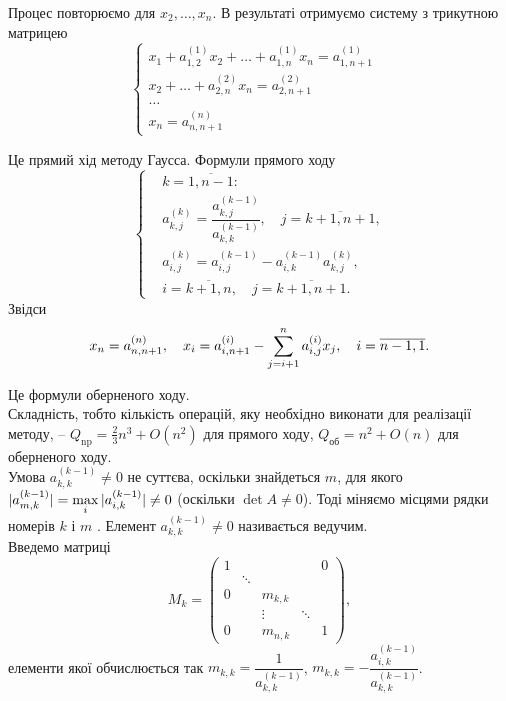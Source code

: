 Процес повторюємо для $x_2, \ldots, x_n$. В результаті отримуємо систему з трикутною матрицею
\begin{equation}
	\label{eq:3.3}
	\left\{
		\begin{aligned}
		x_1 + a_{1,2}^{(1)} x_2 + \ldots + a_{1,n}^{(1)} x_n = a_{1,n+1}^{(1)}& \\
		x_2 + \ldots + a_{2,n}^{(2)} x_n = a_{2,n+1}^{(2)}& \\
		\ldots & \\
		x_n = a_{n,n+1}^{(n)} &
	\end{aligned}
	\right.
\end{equation}

Це прямий хід методу Гаусса. Формули прямого ходу
\[
	\left\{
		\begin{aligned}
			& k = \overline{1, n-1}: \\
			& a_{k,j}^{(k)} = \dfrac{a_{k,j}^{(k-1)}}{a_{k,k}^{(k-1)}}, \quad j =\overline{k+1,n+1}, \\
			& a_{i,j}^{(k)} = a_{i,j}^{(k-1)} - a_{i,k}^{(k-1)} a_{k,j}^{(k)}, \\
			& i = \overline{k+1, n}, \quad j = \overline{k +1, n + 1}.
		\end{aligned}
	\right.
\]
Звідси
\begin{equation}
	\label{eq:3.4}
	x_n = a_{n,n+1}^{(n)}, \quad x_i = a_{i,n+1}^{(i)} - \displaystyle\sum\limits_{j=i+1}^n a_{i,j}^{(i)} x_j, \quad i = \overline{n-1,1}.
\end{equation}

Це формули оберненого ходу. \\

Складність, тобто кількість операцій, яку необхідно виконати для реалізації методу, -- $Q_{\text{np}} = \frac23 n^3 + O(n^2)$ для прямого ходу, $Q_{\text{об}} = n^2 + O(n)$ для оберненого ходу. \\

Умова $a_{k,k}^{(k-1)} \ne 0$ не суттєва, оскільки знайдеться $m$, для якого $|a_{m,k}^{(k-1)}| = \displaystyle\max\limits_i |a_{i,k}^{(k-1)}| \ne 0$ (оскільки $\det A \ne 0$). Тоді міняємо місцями рядки номерів $k$ і $m$ . Елемент $a_{k,k}^{(k-1)} \ne 0$ називається ведучим. \\

Введемо матриці \[ M_k = \begin{pmatrix} 1 & & & & 0 \\ & \ddots & & & \\ 0 & & m_{k,k} & & \\ & & \vdots & \ddots & \\0 & & m_{n,k} & & 1 \end{pmatrix},\]
елементи якої обчислюється так $m_{k,k} = \dfrac{1}{a_{k,k}^{(k-1)}}$, $m_{k,k}=-\dfrac{a_{i,k}^{(k-1)}}{a_{k,k}^{(k-1)}}$. \\

